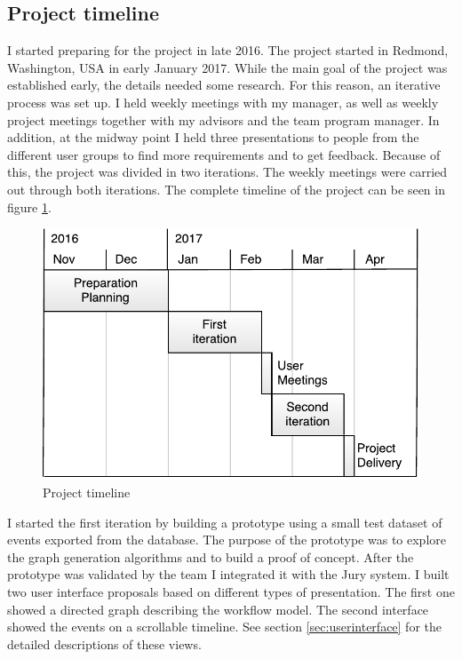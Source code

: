 \subsection{Project timeline}
\label{sec:timeline}
I started preparing for the project in late 2016.
The project started in Redmond, Washington, USA in early January 2017.
While the main goal of the project was established early, the details needed some research. 
For this reason, an iterative process was set up.
I held weekly meetings with my manager, as well as weekly project meetings together with my advisors and the team program manager. 
In addition, at the midway point I held three presentations to people from the different user groups to find more requirements and to get feedback. Because of this, the project was divided in two iterations.
The weekly meetings were carried out through both iterations.
The complete timeline of the project can be seen in figure \ref{fig:projecttimeline}.

\begin{figure}[htb]
\centering \includegraphics[width=0.7\linewidth]{gfx/figures/projecttimeline.pdf}
\caption{Project timeline}
\label{fig:projecttimeline}
\end{figure}

I started the first iteration by building a prototype using a small test dataset of events exported from the database. The purpose of the prototype was to explore the graph generation algorithms and to build a proof of concept. 
After the prototype was validated by the team I integrated it with the Jury system. 
I built two user interface proposals based on different types of presentation. The first one showed a directed graph describing the workflow model. The second interface showed the events on a scrollable timeline.
See section \ref{sec:userinterface} for the detailed descriptions of these views.

